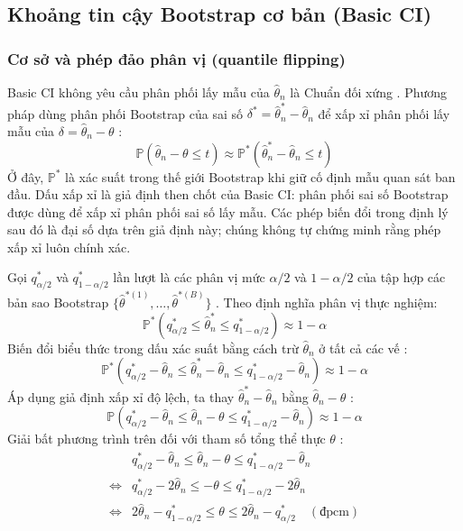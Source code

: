 	\subsection{Khoảng tin cậy Bootstrap cơ bản (Basic CI)}
	
	\subsubsection{Cơ sở và phép đảo phân vị (quantile flipping)}
	Basic CI không yêu cầu phân phối lấy mẫu của $\hat{\theta}_n$ là Chuẩn đối xứng \cite{efron1993}. Phương pháp dùng phân phối Bootstrap của sai số $\delta^*=\hat{\theta}_n^*-\hat{\theta}_n$ để xấp xỉ phân phối lấy mẫu của $\delta=\hat{\theta}_n-\theta$ \cite{davison1997}:
	\begin{equation}
		\mathbb{P}\left(\hat{\theta}_n - \theta \le t\right) \approx \mathbb{P}^*\left(\hat{\theta}_n^* - \hat{\theta}_n \le t\right)
	\end{equation}
	Ở đây, $\mathbb{P}^*$ là xác suất trong thế giới Bootstrap khi giữ cố định
	mẫu quan sát ban đầu. Dấu xấp xỉ là giả định then chốt của Basic CI:
	phân phối sai số Bootstrap được dùng để xấp xỉ phân phối sai số lấy mẫu.
	Các phép biến đổi trong định lý sau đó là đại số dựa trên giả định này;
	chúng không tự chứng minh rằng phép xấp xỉ luôn chính xác.
	\begin{theorem}
		Gọi $q_{\alpha/2}^*$ và $q_{1-\alpha/2}^*$ lần lượt là các phân vị mức $\alpha/2$ và $1-\alpha/2$ của tập hợp các bản sao Bootstrap $\{\hat{\theta}^{*(1)}, \dots, \hat{\theta}^{*(B)}\}$ \cite{davison1997}. Theo định nghĩa phân vị thực nghiệm:
		\begin{equation}
			\mathbb{P}^*\left( q_{\alpha/2}^* \le \hat{\theta}_n^* \le q_{1-\alpha/2}^* \right) \approx 1 - \alpha
		\end{equation}
		Biến đổi biểu thức trong dấu xác suất bằng cách trừ $\hat{\theta}_n$ ở tất cả các vế \cite{davison1997}:
		\begin{equation}
			\mathbb{P}^*\left( q_{\alpha/2}^* - \hat{\theta}_n \le \hat{\theta}_n^* - \hat{\theta}_n \le q_{1-\alpha/2}^* - \hat{\theta}_n \right) \approx 1 - \alpha
		\end{equation}
		Áp dụng giả định xấp xỉ độ lệch, ta thay $\hat{\theta}_n^* - \hat{\theta}_n$ bằng $\hat{\theta}_n - \theta$ \cite{davison1997}:
		\begin{equation}
			\mathbb{P}\left( q_{\alpha/2}^* - \hat{\theta}_n \le \hat{\theta}_n - \theta \le q_{1-\alpha/2}^* - \hat{\theta}_n \right) \approx 1 - \alpha
		\end{equation}
		Giải bất phương trình trên đối với tham số tổng thể thực $\theta$ \cite{davison1997}:
		\begin{align*}
			& q_{\alpha/2}^* - \hat{\theta}_n \le \hat{\theta}_n - \theta \le q_{1-\alpha/2}^* - \hat{\theta}_n \\
			\iff & q_{\alpha/2}^* - 2\hat{\theta}_n \le -\theta \le q_{1-\alpha/2}^* - 2\hat{\theta}_n \\
			\iff & 2\hat{\theta}_n - q_{1-\alpha/2}^* \le \theta \le 2\hat{\theta}_n - q_{\alpha/2}^* \quad (\text{đpcm})
		\end{align*}
	\end{theorem}
	
